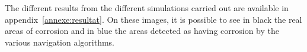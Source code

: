 
The different results from the different simulations carried out are available in appendix~\ref{annexe:resultat}.
On these images, it is possible to see in black the real areas of corrosion and in blue the areas detected as having corrosion by the various navigation algorithms.


